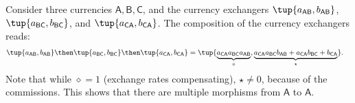 \begin{remark}
Consider three currencies $\mathsf{A,B,C}$, and the currency exchangers $\tup{a_\mathsf{AB},b_\mathsf{AB}}$,
$\tup{a_\mathsf{BC},b_\mathsf{BC}}$, and $\tup{a_\mathsf{CA},b_\mathsf{CA}}$. The composition of the currency exchangers reads:
\begin{equation}
    \begin{aligned}
     \tup{a_\mathsf{AB},b_\mathsf{AB}}\then \tup{a_\mathsf{BC},b_\mathsf{BC}} \then \tup{a_\mathsf{CA},b_\mathsf{CA}} &=\tup{\underbrace{a_\mathsf{CA} a_\mathsf{BC} a_\mathsf{AB}}_{\diamond},\underbrace{a_\mathsf{CA}a_\mathsf{BC}b_\mathsf{AB}+a_\mathsf{CA}b_\mathsf{BC}+b_\mathsf{CA}}_{\star}}.
    \end{aligned}
\end{equation}
Note that while $\diamond=1$ (exchange rates compensating), $\star\neq 0$, because of the commissions. This shows that there are multiple morphisms from $\mathsf{A}$ to $\mathsf{A}$.
\end{remark}


